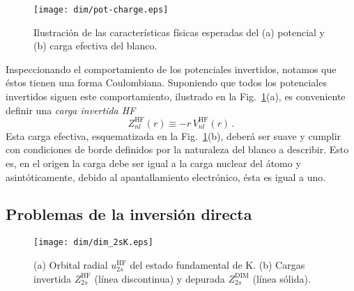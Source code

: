 \begin{figure}[t!]
\centering
\texttt{[image: dim/pot-charge.eps]}
\vspace{-0.3cm}
\caption[Características físicas del potencial y carga efectiva.]
{Ilustración de las características físicas esperadas del (a) potencial 
y (b) carga efectiva del blanco.}
\label{fig:potycharge}
\end{figure}

Inspeccionando el comportamiento de los potenciales invertidos, notamos 
que éstos tienen una forma Coulombiana. Suponiendo que todos los 
potenciales invertidos siguen este comportamiento, ilustrado en la 
Fig.~\ref{fig:potycharge}(a), es conveniente definir una 
\textit{carga invertida HF} 
\begin{equation}
Z_{nl}^{\mathrm{HF}}(r) \equiv -r \, V_{nl}^{\mathrm{HF}}(r) \,.
\label{eq:Zeff}
\end{equation}
Esta carga efectiva, esquematizada en la Fig.~\ref{fig:potycharge}(b), 
deberá ser suave y cumplir con condiciones de borde definidos por la 
naturaleza del blanco a describir. Esto es, en el origen la carga debe 
ser igual a la carga nuclear del átomo y asintóticamente, debido al 
apantallamiento electrónico, ésta es igual a uno.

\subsection{Problemas de la inversión directa}
\label{subsec:probinv}

\begin{figure}
\centering
\texttt{[image: dim/dim\_2sK.eps]} 
\vspace{-0.3cm}
\caption[Orbital radial y carga efectiva correspondiente.]
{(a) Orbital radial $u_{2s}^{\mathrm{HF}}$ del estado fundamental de K.
(b) Cargas invertida $Z_{2s}^{\mathrm{HF}}$ (línea discontinua) 
y depurada $Z_{2s}^{\mathrm{DIM}}$ (línea sólida).}
\label{fig:2sK}
\end{figure}

